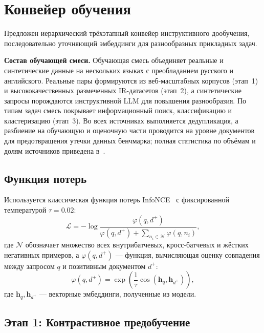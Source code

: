 \section{Конвейер обучения}\label{sec:ge_training}

Предложен иерархический трёхэтапный конвейер инструктивного дообучения, последовательно уточняющий эмбеддинги для разнообразных прикладных задач.

\textbf{Состав обучающей смеси.} Обучающая смесь объединяет реальные и синтетические данные на нескольких языках с преобладанием русского и английского. Реальные пары формируются из веб-масштабных корпусов (этап~1) и высококачественных размеченных IR-датасетов (этап~2), а синтетические запросы порождаются инструктивной LLM для повышения разнообразия. По типам задач смесь покрывает информационный поиск, классификацию и кластеризацию (этап~3). Во всех источниках выполняется дедупликация, а разбиение на обучающую и оценочную части проводится на уровне документов для предотвращения утечки данных бенчмарка; полная статистика по объёмам и долям источников приведена в~\cite{2510.22369}.

\subsection{Функция потерь}\label{subsec:ge_loss}

Используется классическая функция потерь InfoNCE~\cite{oord2019representation} с фиксированной температурой $\tau = 0.02$:
\begin{equation}
\label{eq:infonce}
    \mathcal{L} = -\log \frac{\varphi(q, d^+)}{\varphi(q, d^+) + \sum_{n_i \in \mathcal{N}} \varphi(q, n_i)},
\end{equation}
где $\mathcal{N}$ обозначает множество всех внутрибатчевых, кросс-батчевых и жёстких негативных примеров, а $\varphi(q, d^+)$ --- функция, вычисляющая оценку совпадения между запросом $q$ и позитивным документом $d^+$:
\begin{equation}
\label{eq:matching}
    \varphi(q, d^+) = \exp\!\left(\frac{1}{\tau} \cos(\mathbf{h}_q, \mathbf{h}_{d^+})\right),
\end{equation}
где $\mathbf{h}_q, \mathbf{h}_{d^+}$ --- векторные эмбеддинги, полученные из модели.

\subsection{Этап 1: Контрастивное предобучение}\label{subsec:ge_stage1}

